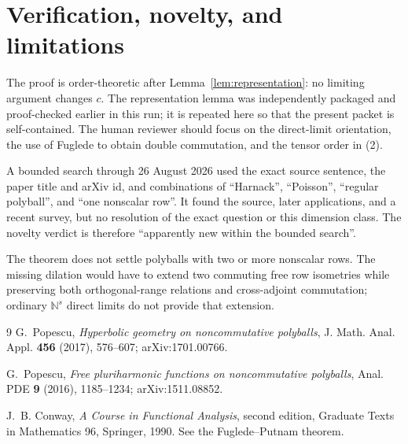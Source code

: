 \documentclass[10pt]{article}
\begin{document}
\section{Verification, novelty, and limitations}

The proof is order-theoretic after Lemma~\ref{lem:representation}: no limiting
argument changes $c$. The representation lemma was independently packaged
and proof-checked earlier in this run; it is repeated here so that the present
packet is self-contained. The human reviewer should focus on the direct-limit
orientation, the use of Fuglede to obtain double commutation, and the tensor
order in (2).

A bounded search through 26 August 2026 used the exact source sentence, the
paper title and arXiv id, and combinations of ``Harnack'', ``Poisson'',
``regular polyball'', and ``one nonscalar row''. It found the source, later
applications, and a recent survey, but no resolution of the exact question or
this dimension class. The novelty verdict is therefore ``apparently new within
the bounded search''.

The theorem does not settle polyballs with two or more nonscalar rows. The
missing dilation would have to extend two commuting free row isometries while
preserving both orthogonal-range relations and cross-adjoint commutation;
ordinary $\mathbb N^s$ direct limits do not provide that extension.

\begin{thebibliography}{9}
G.~Popescu, \emph{Hyperbolic geometry on noncommutative polyballs},
J. Math. Anal. Appl. \textbf{456} (2017), 576--607;
arXiv:1701.00766.

G.~Popescu, \emph{Free pluriharmonic functions on noncommutative polyballs},
Anal. PDE \textbf{9} (2016), 1185--1234;
arXiv:1511.08852.

J.~B. Conway, \emph{A Course in Functional Analysis}, second edition,
Graduate Texts in Mathematics 96, Springer, 1990. See the
Fuglede--Putnam theorem.
\end{thebibliography}
\end{document}
